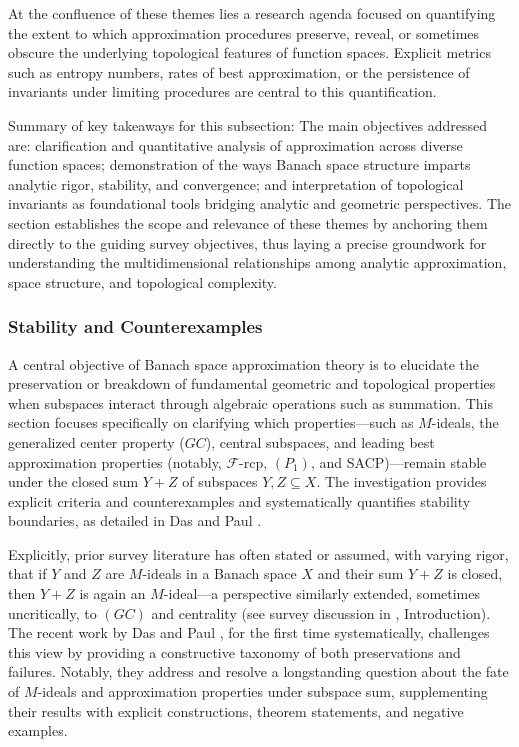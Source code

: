 \documentclass[sigconf]{acmart}
\begin{document}
At the confluence of these themes lies a research agenda focused on quantifying the extent to which approximation procedures preserve, reveal, or sometimes obscure the underlying topological features of function spaces. Explicit metrics such as entropy numbers, rates of best approximation, or the persistence of invariants under limiting procedures are central to this quantification.

Summary of key takeaways for this subsection:
The main objectives addressed are: clarification and quantitative analysis of approximation across diverse function spaces; demonstration of the ways Banach space structure imparts analytic rigor, stability, and convergence; and interpretation of topological invariants as foundational tools bridging analytic and geometric perspectives. The section establishes the scope and relevance of these themes by anchoring them directly to the guiding survey objectives, thus laying a precise groundwork for understanding the multidimensional relationships among analytic approximation, space structure, and topological complexity.

\subsubsection{Stability and Counterexamples}

A central objective of Banach space approximation theory is to elucidate the preservation or breakdown of fundamental geometric and topological properties when subspaces interact through algebraic operations such as summation. This section focuses specifically on clarifying which properties—such as $M$-ideals, the generalized center property ($GC$), central subspaces, and leading best approximation properties (notably, $\mathscr{F}$-rcp, $(P_1)$, and SACP)—remain stable under the closed sum $Y+Z$ of subspaces $Y, Z \subseteq X$. The investigation provides explicit criteria and counterexamples and systematically quantifies stability boundaries, as detailed in Das and Paul \cite{ref103}.

Explicitly, prior survey literature has often stated or assumed, with varying rigor, that if $Y$ and $Z$ are $M$-ideals in a Banach space $X$ and their sum $Y+Z$ is closed, then $Y+Z$ is again an $M$-ideal—a perspective similarly extended, sometimes uncritically, to $(GC)$ and centrality (see survey discussion in \cite{ref103}, Introduction). The recent work by Das and Paul \cite{ref103}, for the first time systematically, challenges this view by providing a constructive taxonomy of both preservations and failures. Notably, they address and resolve a longstanding question about the fate of $M$-ideals and approximation properties under subspace sum, supplementing their results with explicit constructions, theorem statements, and negative examples.
\end{document}
